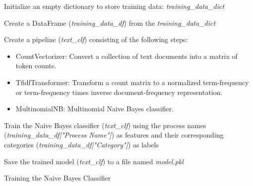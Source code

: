 \documentclass[openany]{report}
\begin{document}
\begin{algorithm}[H]
    \SetAlgoLined
    \BlankLine


    \BlankLine
    Initialize an empty dictionary to store training data: \textit{training\_data\_dict}\;

    \BlankLine
    Create a DataFrame (\textit{training\_data\_df}) from the \textit{training\_data\_dict}\;

    \BlankLine
    Create a pipeline (\textit{text\_clf}) consisting of the following steps:
    \begin{itemize}
        \item CountVectorizer: Convert a collection of text documents into a matrix of token counts.
        \item TfidfTransformer: Transform a count matrix to a normalized term-frequency or term-frequency times inverse document-frequency representation.
        \item MultinomialNB: Multinomial Naive Bayes classifier.
    \end{itemize}

    \BlankLine
    Train the Naive Bayes classifier (\textit{text\_clf}) using the process names (\textit{training\_data\_df["Process Name"]}) as features and their corresponding categories (\textit{training\_data\_df["Category"]}) as labels\;

    \BlankLine
    Save the trained model (\textit{text\_clf}) to a file named \textit{model.pkl}\;

    \BlankLine
    \BlankLine

    \caption{Training the Naive Bayes Classifier}
\end{algorithm}
\end{document}
